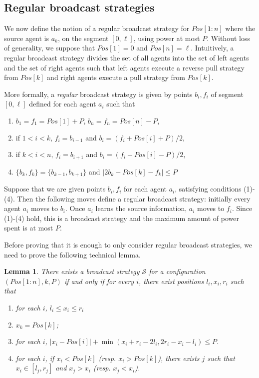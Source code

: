 \documentclass{article}
\newtheorem{lemma}{Lemma}
\newcommand\broadcast{broadcast\xspace}
\newcommand\cS{\ensuremath{\mathcal{S}\xspace}}
\begin{document}
\subsection{Regular {\broadcast} strategies}

We now define the notion of a regular broadcast strategy for $Pos[1:n]$ where the source agent is $a_k$, on the segment $[0,\ell]$, using power at most $P$. Without loss of generality, we suppose that $Pos[1]=0$ and $Pos[n]=\ell$. Intuitively, a regular broadcast strategy divides the set of all agents into the set of left agents and the set of right agents such that left agents execute a reverse pull strategy from $Pos[k]$ and right agents execute a pull strategy from $Pos[k]$.

More formally, a \emph{regular} broadcast strategy is given by points $b_i, f_i$ of segment $[0, \ell]$ defined for each agent $a_i$ such that
\begin{enumerate}
\item $b_1 = f_1 = Pos[1]+P$, $b_n = f_n= Pos[n] -P$,
\item if $1 < i < k$, $f_i= b_{i-1}$ and $b_i = (f_i+Pos[i]+P)/2$,
\item if $k < i < n$, $f_i= b_{i+1}$ and $b_i = (f_i+Pos[i]-P)/2$,
\item $\{b_k,f_k\} = \{b_{k-1},b_{k+1}\}$ and $|2b_k - Pos[k] - f_k|
  \leq P$ 
\end{enumerate}
Suppose that we are given points $b_i, f_i$ for each agent $a_i$, satisfying conditions (1)-(4).
Then the following moves define a regular broadcast strategy:
 initially every agent
$a_i$ moves to $b_i$. Once $a_i$ learns the source information, $a_i$ moves to $f_i$. Since (1)-(4) hold, this is a broadcast strategy and the maximum amount of power spent is at most $P$. 

Before proving that it is enough to only consider regular broadcast strategies, we need to prove the following technical lemma. 

\begin{lemma}\label{lem-strat1-broadcast}
There exists a broadcast strategy $\cS$ for a configuration
$(Pos[1:n],k,P)$ if and only if for every $i$, there exist positions
$l_i, x_i, r_i$ such that
\begin{enumerate}[(1)]
\item  for each $i$,  $l_i \leq x_i \leq r_i$
\item $x_k = Pos[k]$;
\item for each $i$, $|x_i - Pos[i]| + \min(x_i+r_i-2l_i, 2r_i-x_i-l_i)
  \leq P$.
\item for each $i$, if $x_i < Pos[k]$ (resp. $x_i > Pos[k]$), there
  exists $j$ such that $x_i \in [l_j,r_j]$ and $x_j > x_i$ (resp. $x_j
  < x_i$).
\end{enumerate}
\end{lemma}
\end{document}
